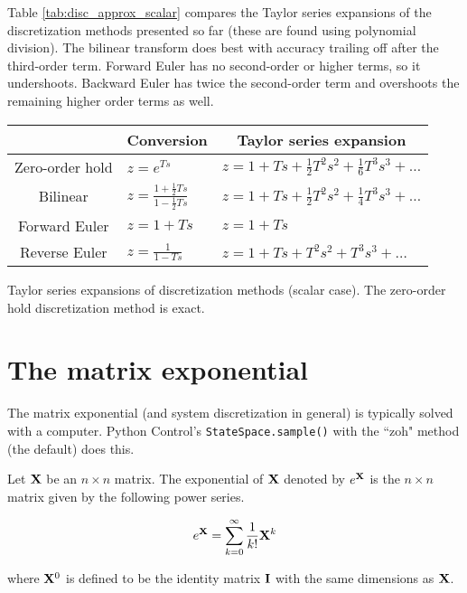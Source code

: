 Table \ref{tab:disc_approx_scalar} compares the Taylor series expansions of the
discretization methods presented so far (these are found using polynomial
division). The bilinear transform does best with accuracy trailing off after the
third-order term. Forward Euler has no second-order or higher terms, so it
undershoots. Backward Euler has twice the second-order term and overshoots the
remaining higher order terms as well.

\begin{booktable}
  \begin{tabular}{|cll|}
    \hline
    \rowcolor{headingbg}
    \multicolumn{1}{|c}{\textbf{Method}} &
      \multicolumn{1}{c}{\textbf{Conversion}} &
      \multicolumn{1}{c|}{\textbf{Taylor series expansion}} \\
    \hline
    Zero-order hold &
      $z = e^{Ts}$ &
      $z = 1 + Ts + \frac{1}{2}T^2s^2 + \frac{1}{6}T^3s^3 + \ldots$ \\
    Bilinear &
      $z = \frac{1 + \frac{1}{2}Ts}{1 - \frac{1}{2}Ts}$ &
      $z = 1 + Ts + \frac{1}{2}T^2s^2 + \frac{1}{4}T^3s^3 + \ldots$ \\
    Forward Euler &
      $z = 1 + Ts$ &
      $z = 1 + Ts$ \\
    Reverse Euler &
      $z = \frac{1}{1 - Ts}$ &
      $z = 1 + Ts + T^2s^2 + T^3s^3 + \ldots$ \\
    \hline
  \end{tabular}
  \caption{Taylor series expansions of discretization methods (scalar case). The
    zero-order hold discretization method is exact.}
  \label{tab:disc_approx_scalar}
\end{booktable}

\section{The matrix exponential}

The matrix exponential (and \gls{system} \gls{discretization} in general) is
typically solved with a computer. Python Control's \texttt{StateSpace.sample()}
with the ``zoh" method (the default) does this.

\begin{definition}
  Let $\mathbf{X}$ be an $n \times n$ matrix. The exponential of $\mathbf{X}$ denoted
  by $e^{\mathbf{X}}$ is the $n \times n$ matrix given by the following power
  series.

  \begin{equation}
    e^{\mathbf{X}} = \sum_{k=0}^\infty \frac{1}{k!} \mathbf{X}^k \label{eq:mat_exp}
  \end{equation}

  where $\mathbf{X}^0$ is defined to be the identity matrix $\mathbf{I}$ with the same
  dimensions as $\mathbf{X}$.
\end{definition}

